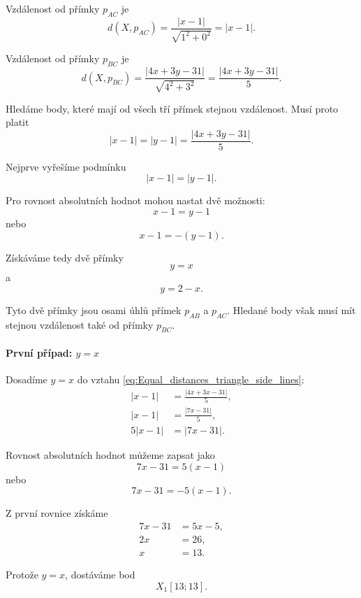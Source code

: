 \begin{example}
    Vzdálenost od přímky $p_{AC}$ je
    \[
        d(X,p_{AC})
        =
        \frac{|x-1|}{\sqrt{1^2+0^2}}
        =
        |x-1|.
    \]

    Vzdálenost od přímky $p_{BC}$ je
    \[
        d(X,p_{BC})
        =
        \frac{|4x+3y-31|}{\sqrt{4^2+3^2}}
        =
        \frac{|4x+3y-31|}{5}.
    \]

    Hledáme body, které mají od všech tří přímek stejnou vzdálenost.
    Musí proto platit
    \begin{equation}\label{eq:Equal_distances_triangle_side_lines}
        |x-1|
        =
        |y-1|
        =
        \frac{|4x+3y-31|}{5}.
    \end{equation}

    Nejprve vyřešíme podmínku
    \[
        |x-1|=|y-1|.
    \]

    Pro rovnost absolutních hodnot mohou nastat dvě možnosti:
    \[
        x-1=y-1
    \]
    nebo
    \[
        x-1=-(y-1).
    \]

    Získáváme tedy dvě přímky
    \[
        y=x
    \]
    a
    \[
        y=2-x.
    \]

    Tyto dvě přímky jsou osami úhlů přímek $p_{AB}$ a $p_{AC}$.
    Hledané body však musí mít stejnou vzdálenost také od přímky
    $p_{BC}$.

    \paragraph{První případ: $y=x$}

    Dosadíme $y=x$ do vztahu
    \eqref{eq:Equal_distances_triangle_side_lines}:
    \begin{align*}
        |x-1|
        &=
        \frac{|4x+3x-31|}{5},\\
        |x-1|
        &=
        \frac{|7x-31|}{5},\\
        5|x-1|
        &=
        |7x-31|.
    \end{align*}

    Rovnost absolutních hodnot můžeme zapsat jako
    \[
        7x-31=5(x-1)
    \]
    nebo
    \[
        7x-31=-5(x-1).
    \]

    Z první rovnice získáme
    \begin{align*}
        7x-31&=5x-5,\\
        2x&=26,\\
        x&=13.
    \end{align*}

    Protože $y=x$, dostáváme bod
    \[
        X_1[13;13].
    \]


\end{example}
